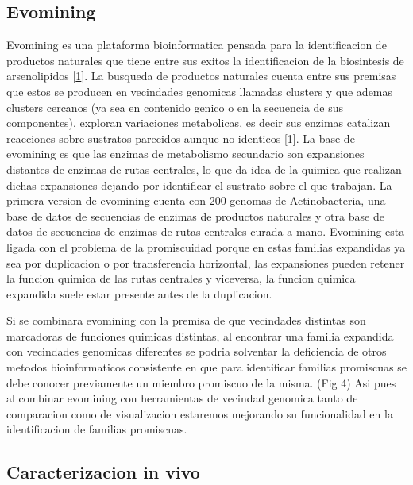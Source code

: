 \documentclass[12pt,twoside]{reedthesis}
\begin{document}
  \subsection{Evomining}\label{evomining-1}
  
  Evomining es una plataforma bioinformatica pensada para la
  identificacion de productos naturales que tiene entre sus exitos la
  identificacion de la biosintesis de arsenolipidos
  {[}\protect\hyperlink{ref-cruz-morales_phylogenomic_2016}{1}{]}. La
  busqueda de productos naturales cuenta entre sus premisas que estos se
  producen en vecindades genomicas llamadas clusters y que ademas clusters
  cercanos (ya sea en contenido genico o en la secuencia de sus
  componentes), exploran variaciones metabolicas, es decir sus enzimas
  catalizan reacciones sobre sustratos parecidos aunque no identicos
  {[}\protect\hyperlink{ref-cruz-morales_phylogenomic_2016}{1}{]}. La base
  de evomining es que las enzimas de metabolismo secundario son
  expansiones distantes de enzimas de rutas centrales, lo que da idea de
  la quimica que realizan dichas expansiones dejando por identificar el
  sustrato sobre el que trabajan. La primera version de evomining cuenta
  con 200 genomas de Actinobacteria, una base de datos de secuencias de
  enzimas de productos naturales y otra base de datos de secuencias de
  enzimas de rutas centrales curada a mano. Evomining esta ligada con el
  problema de la promiscuidad porque en estas familias expandidas ya sea
  por duplicacion o por transferencia horizontal, las expansiones pueden
  retener la funcion quimica de las rutas centrales y viceversa, la
  funcion quimica expandida suele estar presente antes de la duplicacion.
  
  Si se combinara evomining con la premisa de que vecindades distintas son
  marcadoras de funciones quimicas distintas, al encontrar una familia
  expandida con vecindades genomicas diferentes se podria solventar la
  deficiencia de otros metodos bioinformaticos consistente en que para
  identificar familias promiscuas se debe conocer previamente un miembro
  promiscuo de la misma. (Fig 4) Asi pues al combinar evomining con
  herramientas de vecindad genomica tanto de comparacion como de
  visualizacion estaremos mejorando su funcionalidad en la identificacion
  de familias promiscuas.
  
  \subsection{Caracterizacion in vivo}\label{caracterizacion-in-vivo}
  
\end{document}
